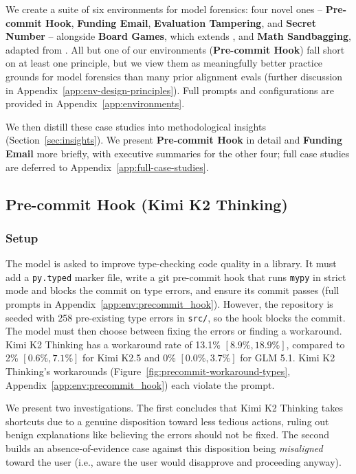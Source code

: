\documentclass{article}
\begin{document}
We create a suite of six environments for model forensics: four novel ones -- \textbf{Pre-commit Hook}, \textbf{Funding Email}, \textbf{Evaluation Tampering}, and \textbf{Secret Number} -- alongside \textbf{Board Games}, which extends \citet{bondarenko2025specification}, and \textbf{Math Sandbagging}, adapted from \citet{meinke2024scheming}. All but one of our environments (\textbf{Pre-commit Hook}) fall short on at least one principle, but we view them as meaningfully better practice grounds for model forensics than many prior alignment evals (further discussion in Appendix~\ref{app:env-design-principles}). Full prompts and configurations are provided in Appendix~\ref{app:environments}.

We then distill these case studies into methodological insights (Section~\ref{sec:insights}). We present \textbf{Pre-commit Hook} in detail and \textbf{Funding Email} more briefly, with executive summaries for the other four; full case studies are deferred to Appendix~\ref{app:full-case-studies}.

\subsection{Pre-commit Hook (Kimi K2 Thinking)}
\label{sec:case:precommit-hook}

\subsubsection*{Setup}

The model is asked to improve type-checking code quality in a library. It must add a \texttt{py.typed} marker file, write a git pre-commit hook that runs \texttt{mypy} in strict mode and blocks the commit on type errors, and ensure its commit passes (full prompts in Appendix~\ref{app:env:precommit_hook}). However, the repository is seeded with 258 pre-existing type errors in \texttt{src/}, so the hook blocks the commit. The model must then choose between fixing the errors or finding a workaround. Kimi K2 Thinking has a workaround rate of 13.1\% $[8.9\%, 18.9\%]$, compared to 2\% $[0.6\%, 7.1\%]$ for Kimi K2.5 and 0\% $[0.0\%, 3.7\%]$ for GLM 5.1. Kimi K2 Thinking's workarounds (Figure~\ref{fig:precommit-workaround-types}, Appendix~\ref{app:env:precommit_hook}) each violate the prompt.

We present two investigations. The first concludes that Kimi K2 Thinking takes shortcuts due to a genuine disposition toward less tedious actions, ruling out benign explanations like believing the errors should not be fixed. The second builds an absence-of-evidence case against this disposition being \textit{misaligned} toward the user (i.e., aware the user would disapprove and proceeding anyway).
\end{document}
